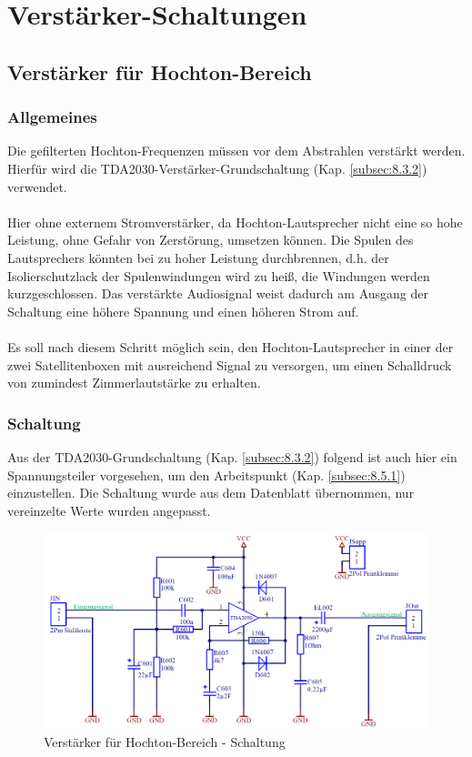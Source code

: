 
\section{Verstärker-Schaltungen}


\subsection{Verstärker für Hochton-Bereich}\label{subsec:5.1}
\subsubsection{Allgemeines}\label{subsec:5.1.1}
Die gefilterten Hochton-Frequenzen müssen vor dem Abstrahlen verstärkt werden.
Hierfür wird die TDA2030-Verstärker-Grundschaltung (Kap. \ref{subsec:8.3.2}) verwendet.
\\ \\
Hier ohne externem Stromverstärker, da Hochton-Lautsprecher nicht eine so hohe Leistung, ohne Gefahr von Zerstörung, umsetzen können.
Die Spulen des Lautsprechers könnten bei zu hoher Leistung durchbrennen, d.h. der Isolierschutzlack der Spulenwindungen wird zu heiß, die Windungen werden kurzgeschlossen.
Das verstärkte Audiosignal weist dadurch am Ausgang der Schaltung eine höhere Spannung und einen höheren Strom auf.
\\ \\
Es soll nach diesem Schritt möglich sein, den Hochton-Lautsprecher in einer der zwei Satellitenboxen mit ausreichend Signal zu versorgen, um einen Schalldruck von zumindest Zimmerlautstärke zu erhalten. 

\newpage
\subsubsection{Schaltung}\label{subsec:5.1.2}
Aus der TDA2030-Grundschaltung (Kap. \ref{subsec:8.3.2}) folgend ist auch hier ein Spannungsteiler vorgesehen, um den Arbeitspunkt (Kap. \ref{subsec:8.5.1}) einzustellen.
Die Schaltung wurde aus dem Datenblatt übernommen, nur vereinzelte Werte wurden angepasst. 

\begin{figure} [H]
	\centering	
	\includegraphics[width=1\textwidth]{img/Print6/HTVerstaerker-Schem.PNG}
	\caption{Verstärker für Hochton-Bereich - Schaltung}
	\label {fig:5.1.2.1}
\end{figure}

